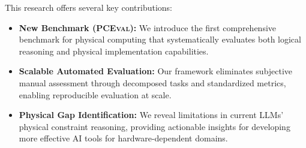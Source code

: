 \documentclass{article} %
\begin{document}

This research offers several key contributions:
\begin{itemize}[itemsep=0em, topsep=0.3em, labelsep=0.5em, leftmargin=1.2em]
    \item \textbf{New Benchmark (\textsc{PCEval}):} We introduce the first comprehensive benchmark for physical computing that systematically evaluates both logical reasoning and physical implementation capabilities.
    \item \textbf{Scalable Automated Evaluation:} Our framework eliminates subjective manual assessment through decomposed tasks and standardized metrics, enabling reproducible evaluation at scale.
    \item \textbf{Physical Gap Identification:} We reveal limitations in current LLMs' physical constraint reasoning, providing actionable insights for developing more effective AI tools for hardware-dependent domains.
\end{itemize}

\end{document}
